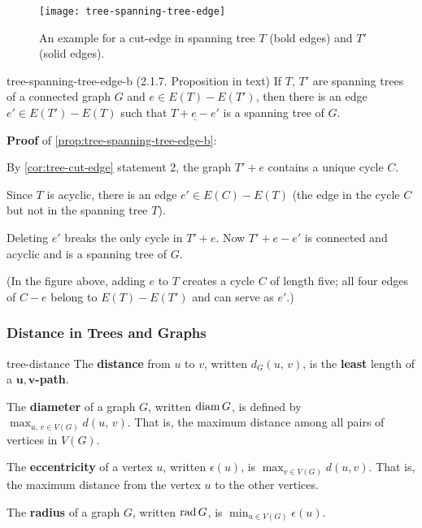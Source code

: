 \documentclass[../src/handouts/main.tex]{subfiles}
\begin{document}
\begin{figure}[htbp]
  \centering
  \texttt{[image: tree-spanning-tree-edge]}
  \caption{An example for a cut-edge in spanning tree $T$ (bold edges) and $T'$ (solid edges).}
  \label{fig:tree-spanning-tree-edge}
\end{figure}

\begin{proposition}{}{tree-spanning-tree-edge-b}
  (2.1.7. Proposition in text)
  If $T,\, T'$ are spanning trees of a connected graph $G$ and $e \in E(T) - E \left( T' \right)$, then there is an edge $e' \in E \left( T' \right) - E(T)$ such that $\underline{T + e - e'}$ is a spanning tree of $G$.
\end{proposition}

\textbf{Proof} of \cref{prop:tree-spanning-tree-edge-b}:
\begin{enumerate*}
  \item {}
  \item By \cref{cor:tree-cut-edge} statement 2, the graph $T' + e$ contains a unique cycle $C$.
  \item Since $T$ is acyclic, there is an edge $e' \in E(C) - E(T)$ (the edge in the cycle $C$ but not in the spanning tree $T$).
  \item Deleting $e'$ breaks the only cycle in $T' + e$. Now $T' + e - e'$ is connected and acyclic and is a spanning tree of $G$.
  \item (In the figure above, adding $e$ to $T$ creates a cycle $C$ of length five; all four edges of $C - e$ belong to $E(T) - E \left( T' \right)$ and can serve as $e'$.)
\end{enumerate*}



\subsubsection{Distance in Trees and Graphs}

\begin{definition}{}{tree-distance}
  The \textbf{distance} from $u$ to $v$, written $d_G(u,\, v)$, is the \textbf{least} length of a $\bm{u, v}$\textbf{-path}.

  The \textbf{diameter} of a graph $G$, written $\operatorname*{diam} G$, is defined by $\max _{u,\, v \in V(G)} d(u,\, v)$. That is, the maximum distance among all pairs of vertices in $V(G)$.

  The \textbf{eccentricity} of a vertex $u$, written $\epsilon(u)$, is $\max _{v \in V(G)} d(u, v)$. That is, the maximum distance from the vertex $u$ to the other vertices.

  The \textbf{radius} of a graph $G$, written $\operatorname*{rad} G$, is $\min _{u \in V(G)} \epsilon(u)$.
\end{definition}
\end{document}
